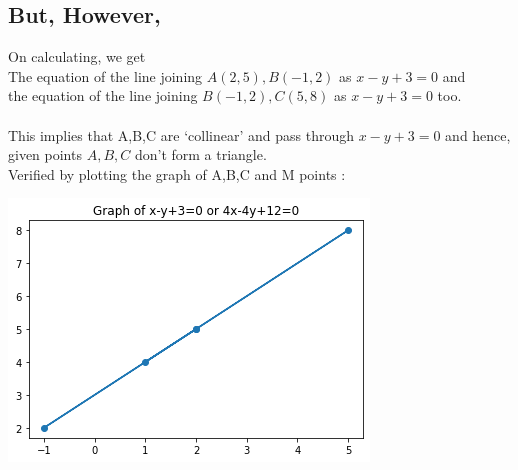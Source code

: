 \documentclass[journal,12pt,twocolumn]{IEEEtran}
\begin{document}
\subsection*{But, However,} On calculating, we get\\
The equation of the line joining $A(2,5), B(-1,2)$ as $x-y+3=0$ and \\
the equation of the line joining $B(-1,2), C(5,8)$ as $x-y+3=0$ too.\\\\
This implies that A,B,C are `collinear' and pass through $x-y+3=0$ and hence, given points $A,B,C$ don't form a triangle.\newline\\
Verified by plotting the graph of A,B,C and M points :
\begin{center}
  \includegraphics[scale=0.5]{prv1b.png}
\end{center}
    
\end{document}
